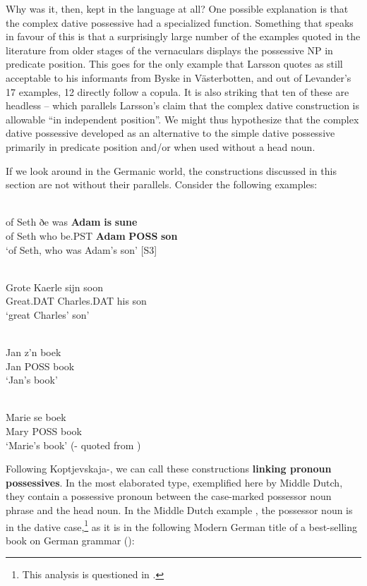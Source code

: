 Why was it, then, kept in the language at all? One possible explanation is that the complex dative possessive had a specialized function. Something that speaks in favour of this is that a surprisingly large number of the examples quoted in the literature from older stages of the vernaculars displays the possessive NP in predicate position. This goes for the only example that Larsson quotes as still acceptable to his informants from Byske in Västerbotten, and out of Levander’s 17 examples, 12 directly follow a copula. It is also striking that ten of these are headless – which parallels Larsson’s claim that the complex dative construction is allowable “in independent position”. We might thus hypothesize that the complex dative possessive developed as an alternative to the simple dative possessive primarily in predicate position and/or when used without a head noun. 

If we look around in the Germanic world, the constructions discussed in this section are not without their parallels. Consider the following examples: 

\ea\label{}
\\
\gll of  Seth  ðe  was  \textbf{Adam} \textbf{is} \textbf{sune}\\
of  Seth  who  be.PST  \textbf{Adam} \textbf{POSS} \textbf{son}\\
\glt ‘of Seth, who was Adam’s son’ [S3]
\z

\ea\label{}
\\
\gll Grote  Kaerle  sijn  soon\\
Great.DAT  Charles.DAT  his  son\\
\glt ‘great Charles’ son’
\z

\ea\label{}
\\
\gll Jan  z’n  boek\\
Jan  POSS   book\\
\glt ‘Jan’s book’
\z

\ea\label{}
\\
\gll Marie  se  boek\\
Mary  POSS  book\\
\glt ‘Marie’s book’ (- quoted from \citet[56]{Norde1997})
\z

Following Koptjevskaja-\citet{Tamm2003}, we can call these constructions \textbf{linking pronoun possessives}. In the most elaborated type, exemplified here by Middle Dutch, they contain a possessive pronoun between the case-marked possessor noun phrase and the head noun. In the Middle Dutch example , the possessor noun is in the dative case,\footnote{ This analysis is questioned in \citet{Allen2008}.} as it is in the following Modern German title of a best-selling book on German grammar (\citet{Sick2004}):

